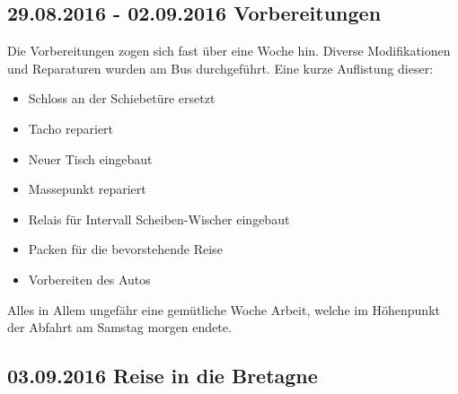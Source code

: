 % 
%
\subsection{29.08.2016 - 02.09.2016 Vorbereitungen}
Die Vorbereitungen zogen sich fast über eine Woche hin. Diverse Modifikationen und Reparaturen wurden am Bus durchgeführt. Eine kurze Auflistung dieser:

\begin{itemize}
    \item Schloss an der Schiebetüre ersetzt
    \item Tacho repariert
    \item Neuer Tisch eingebaut
    \item Massepunkt repariert
    \item Relais für Intervall Scheiben-Wischer eingebaut
    \item Packen für die bevorstehende Reise
    \item Vorbereiten des Autos
\end{itemize}

Alles in Allem ungefähr eine gemütliche Woche Arbeit, welche im Höhenpunkt der Abfahrt am Samstag morgen endete.

\subsection{03.09.2016 Reise in die Bretagne}

